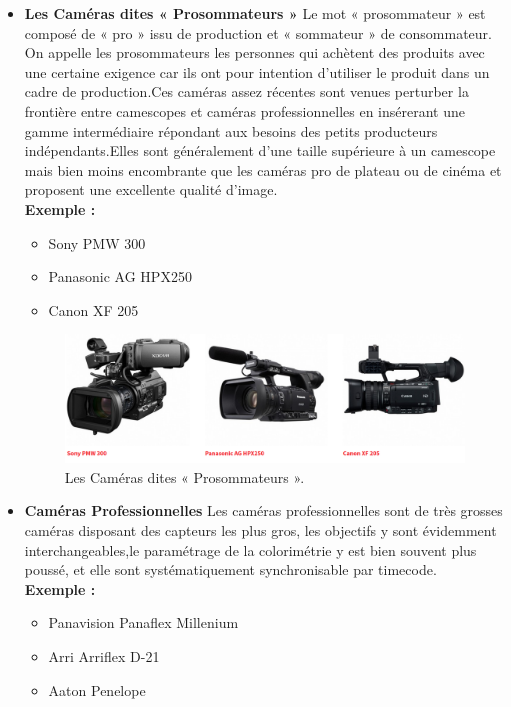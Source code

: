 \begin{itemize}
		
	\item \textbf{Les Caméras dites « Prosommateurs »} Le mot « prosommateur » est composé de « pro » issu de production et « sommateur » de consommateur. On appelle les prosommateurs les personnes qui achètent des produits avec une certaine exigence car ils ont pour intention d’utiliser le produit dans un cadre de production.Ces caméras assez récentes sont venues perturber la frontière entre camescopes et caméras professionnelles en insérerant une gamme intermédiaire répondant aux besoins des petits producteurs indépendants.Elles sont généralement d’une taille supérieure à un camescope mais bien moins encombrante que les caméras pro de plateau ou de cinéma et proposent une excellente qualité d’image.\\
			\textbf{Exemple :\\}
		\begin{itemize}
			\item Sony PMW 300
			\item Panasonic AG HPX250
			\item Canon XF 205
		\end{itemize}
		\vspace{4 cm}
		\begin{figure}[h]
			\centering
			\includegraphics[scale=0.3]{image/prosommateur.png}
			\decoRule
			\caption[Les Caméras dites « Prosommateurs »]{Les Caméras dites « Prosommateurs ».}
			\label{fig:Les Caméras dites « Prosommateurs »}
		\end{figure}
		
	\item \textbf{Caméras Professionnelles} Les caméras professionnelles sont de très grosses caméras disposant des capteurs les plus gros, les objectifs y sont évidemment interchangeables,le paramétrage de la colorimétrie y est bien souvent plus poussé, et elle sont systématiquement synchronisable par timecode. \\
			\textbf{Exemple :\\}
		\begin{itemize}
			\item Panavision Panaflex Millenium
			\item Arri Arriflex D-21
			\item Aaton Penelope
		\end{itemize}
 		

\end{itemize}
